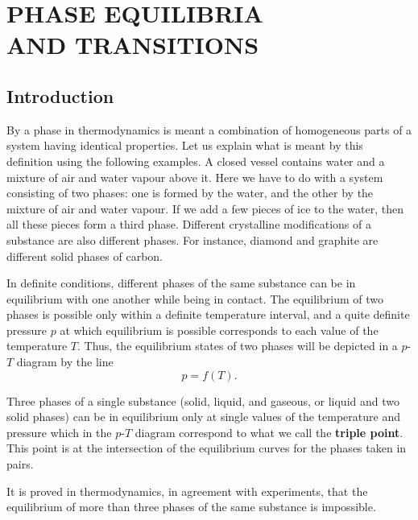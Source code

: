 
\chapter[PHASE EQUILIBRIA AND TRANSITIONS]{PHASE EQUILIBRIA\\ AND TRANSITIONS}\label{chap:15}

\section{Introduction}\label{sec:15_1}

By a phase in thermodynamics is meant a combination of homogeneous parts of a system having identical properties. Let us explain what is meant by this definition using the following examples. A closed vessel contains water and a mixture of air and water vapour above it. Here we have to do with a system consisting of two phases: one is formed by the water, and the other by the mixture of air and water vapour. If we add a few pieces of ice to the water, then all these pieces form a third phase. Different crystalline modifications of a substance are also different phases. For instance, diamond and graphite are different solid phases of carbon.

In definite conditions, different phases of the same substance can be in equilibrium with one another while being in contact. The equilibrium of two phases is possible only within a definite temperature interval, and a quite definite pressure $p$ at which equilibrium is possible corresponds to each value of the temperature $T$. Thus, the equilibrium states of two phases will be depicted in a $p$-$T$ diagram by the line
\begin{equation}\label{eq:15_1}
    p = f(T).
\end{equation}

Three phases of a single substance (solid, liquid, and gaseous, or liquid and two solid phases) can be in equilibrium only at single values of the temperature and pressure which in the $p$-$T$ diagram correspond to what we call the \textbf{triple point}. This point is at the intersection of the equilibrium curves for the phases taken in pairs.

It is proved in thermodynamics, in agreement with experiments, that the equilibrium of more than three phases of the same substance is impossible.

